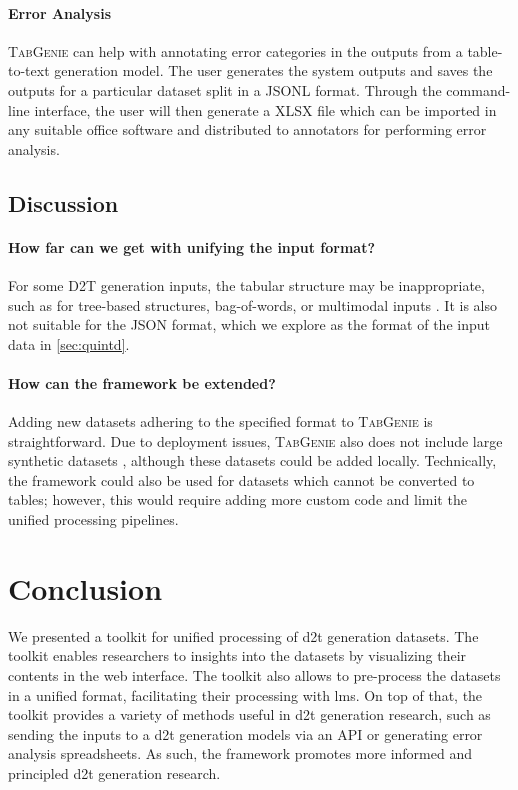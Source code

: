 \paragraph{Error Analysis} \textsc{TabGenie} can help with annotating error categories in the outputs from a table-to-text generation model. The user generates the system outputs and saves the outputs for a particular dataset split in a JSONL format. Through the command-line interface, the user will then generate a XLSX file which can be imported in any suitable office software and distributed to annotators for performing error analysis.

\subsection{Discussion}

\paragraph{How far can we get with unifying the input format?} For some D2T generation inputs, the tabular structure may be inappropriate, such as for tree-based structures, bag-of-words, or multimodal inputs \cite{balakrishnan2019constrained,lin2019commongen,krishna2017visual}. It is also not suitable for the JSON format, which we explore as the format of the input data in \autoref{sec:quintd}.

\paragraph{How can the framework be extended?} Adding new datasets adhering to the specified format to \textsc{TabGenie} is straightforward. Due to deployment issues, \textsc{TabGenie} also does not include large synthetic datasets \cite{agarwalKnowledgeGraphBased2021,jinGenWikiDatasetMillion2020}, although these datasets could be added locally. Technically, the framework could also be used for datasets which cannot be converted to tables; however, this would require adding more custom code and limit the unified processing pipelines.

\section{Conclusion}
We presented a toolkit for unified processing of \ac{d2t} generation datasets. The toolkit enables researchers to insights into the datasets by visualizing their contents in the web interface. The toolkit also allows to pre-process the datasets in a unified format, facilitating their processing with \acp{lm}. On top of that, the toolkit provides a variety of methods useful in \ac{d2t} generation research, such as sending the inputs to a \ac{d2t} generation models via an API or generating error analysis spreadsheets. As such, the framework promotes more informed and principled \ac{d2t} generation research.